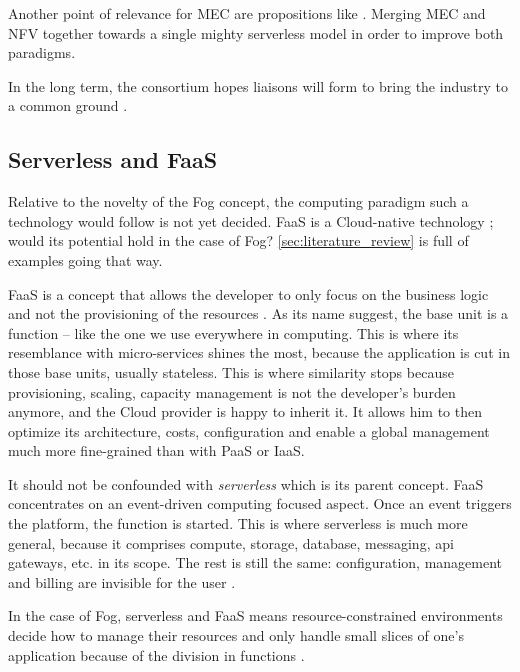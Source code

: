 \documentclass[11pt]{sdm}
\begin{document}
Another point of relevance for \gls{MEC} are propositions like . Merging \gls{MEC} and \gls{NFV} together towards a single mighty serverless model in order to improve both paradigms.

In the long term, the consortium hopes liaisons will form to bring the industry to a common ground \cite{ieee_standards_association_ieee_2018}.

\hypersetup{linkcolor=}
\subsection{Serverless and \acrfull{FaaS}}

Relative to the novelty of the Fog concept, the computing paradigm such a technology would follow is not yet decided. \gls{FaaS} is a Cloud-native technology ; would its potential hold in the case of Fog? \ref{sec:literature_review} is full of examples going that way.

\gls{FaaS} is a concept that allows the developer to only focus on the business logic and not the provisioning of the resources \cite{redhat_what_2020}. As its name suggest, the base unit is a function -- like the one we use everywhere in computing. This is where its resemblance with micro-services shines the most, because the application is cut in those base units, usually stateless. This is where similarity stops because provisioning, scaling, capacity management is not the developer's burden anymore, and the Cloud provider is happy to inherit it. It allows him to then optimize its architecture, costs, configuration and enable a global management much more fine-grained than with \gls{PaaS} or \gls{IaaS}.

It should not be confounded with \emph{serverless} which is its parent concept. \gls{FaaS} concentrates on an event-driven computing focused aspect. Once an event triggers the platform, the function is started. This is where serverless is much more general, because it comprises compute, storage, database, messaging, api gateways, etc. in its scope. The rest is still the same: configuration, management and billing are invisible for the user \cite{ibm_faas_2019}.

In the case of Fog, serverless and \gls{FaaS} means resource-constrained environments decide how to manage their resources and only handle small slices of one's application because of the division in functions \cite{bermbach_auctionwhisk_2021}.
\end{document}
